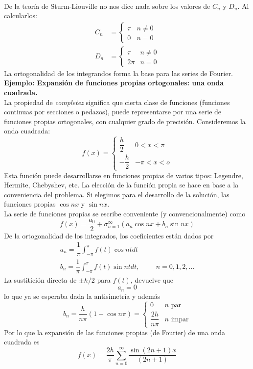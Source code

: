 \\
De la teoría de Sturm-Liouville no nos dice nada sobre los valores de $C_{n}$ y $D_{n}$. Al calcularlos:
\begin{eqnarray*}
C_{n} &= \begin{cases}
\pi  & n \neq 0 \\
0  & n = 0 \end{cases}  \nonumber \\
D_{n} &= \begin{cases}
\pi & n \neq 0 \\
2 \pi & n = 0 \end{cases}
\end{eqnarray*}
La ortogonalidad de los integrandos forma la base para las series de Fourier.
\\
\textbf{Ejemplo: Expansión de funciones propias ortogonales: una onda cuadrada.}
\\
La propiedad de \emph{completez} significa que cierta clase de funciones (funciones continuas por secciones o pedazos), puede representarse por una serie de funciones propias ortogonales, con cualquier grado de precisión. Consideremos la onda cuadrada:
\begin{equation}
f(x) = \begin{cases}
\dfrac{h}{2} & 0 < x < \pi \\
- \dfrac{h}{2} & -\pi < x < o
\end{cases}
\label{eq_ecuacion_36}
\end{equation}
Esta función puede desarrollarse en funciones propias de varios tipos: Legendre, Hermite, Chebyshev, etc. La elección de la función propia se hace en base a la conveniencia del problema. Si elegimos para el desarrollo de la solución, las funciones propias $\cos nx$ y $\sin nx$.
\\
La serie de funciones propias se escribe conveniente (y convencionalmente) como
\[ f(x) = \dfrac{a_{0}}{2} + \sigma_{n=1}^{\infty} (a_{n} \cos nx +  b_{n} \sin nx) \]
De la ortogonalidad de los integrados, los coeficientes están dados por
\begin{eqnarray*}
a_{n} = \dfrac{1}{\pi} \int_{-\pi}^{\pi} f(t) \cos nt dt \\
b_{n} = \dfrac{1}{\pi} \int_{-\pi}^{\pi} f(t) \sin nt dt, \hspace{1cm} n = 0,1,2,\ldots
\end{eqnarray*}
La sustitición directa de $\pm h/2$ para $f(t)$, devuelve que
\[ a_{n} = 0 \]
lo que ya se esperaba dada la antisimetría y además
\[ b_{n} = \dfrac{h}{n \pi} (1 - \cos n \pi) = \begin{cases}
0 & n \text{ par} \\
\dfrac{2h}{n \pi} & n \text{ impar} \end{cases} \]
Por lo que la expansión de las funciones propias (de Fourier) de una onda cuadrada es
\begin{equation}
f(x) = \dfrac{2h}{\pi} \sum_{n=0}^{\infty} \dfrac{\sin(2n+1)x}{(2n+1)}
\end{equation}
